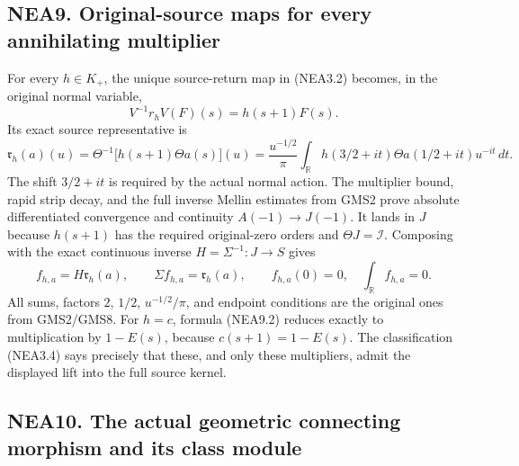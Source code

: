 \subsection{NEA9. Original-source maps for every annihilating
multiplier}\label{nea9.-original-source-maps-for-every-annihilating-multiplier}

For every \(h\in K_+\), the unique source-return map in (NEA3.2)
becomes, in the original normal variable, \[
V^{-1}r_hV(F)(s)=h(s+1)F(s).
\tag{NEA9.1}
\] Its exact source representative is \[
\mathfrak r_h(a)(u)=\Theta^{-1}\bigl[h(s+1)\Theta a(s)\bigr](u)
=\frac{u^{-1/2}}\pi\int_{\mathbb R}
h(3/2+it)\Theta a(1/2+it)u^{-it}\,dt.
\tag{NEA9.2}
\] The shift \(3/2+it\) is required by the actual normal action. The
multiplier bound, rapid strip decay, and the full inverse Mellin
estimates from GMS2 prove absolute differentiated convergence and
continuity \(A(-1)\to J(-1)\). It lands in \(J\) because \(h(s+1)\) has
the required original-zero orders and \(\Theta J=\mathcal I\). Composing
with the exact continuous inverse \(H=\Sigma^{-1}:J\to S\) gives \[
f_{h,a}=H\mathfrak r_h(a),\qquad
\Sigma f_{h,a}=\mathfrak r_h(a),\qquad
f_{h,a}(0)=0,\quad\int_{\mathbb R}f_{h,a}=0.
\tag{NEA9.3}
\] All sums, factors \(2\), \(1/2\), \(u^{-1/2}/\pi\), and endpoint
conditions are the original ones from GMS2/GMS8. For \(h=c\), formula
(NEA9.2) reduces exactly to multiplication by \(1-E(s)\), because
\(c(s+1)=1-E(s)\). The classification (NEA3.4) says precisely that
these, and only these multipliers, admit the displayed lift into the
full source kernel.

\subsection{NEA10. The actual geometric connecting morphism and its
class
module}\label{nea10.-the-actual-geometric-connecting-morphism-and-its-class-module}

